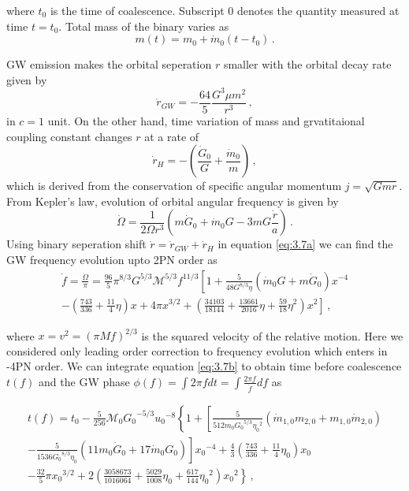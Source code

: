 \documentclass[prd,twocolumn,nofootinbib]{revtex4-1}
\begin{document}
 where $t_0$ is the time of coalescence. Subscript $0$ denotes the quantity measured at time $t=t_0$. Total mass of the binary varies as
 \begin{equation}
 m(t)=m_0+\dot{m}_0(t-t_0)\,.
 \end{equation}
 
 \hspace*{15.5pt}GW emission makes the orbital seperation $r$ smaller with the orbital decay rate given by \cite{PhysRevD.49.2658}
 \begin{equation}
 \dot{r}_{GW}=-\frac{64}{5}\frac{G^3 \mu m^2}{r^3}\,,
 \end{equation}
 in $c=1$ unit. On the other hand, time variation of mass and grvatitaional coupling constant changes $r$ at a rate of 
 \begin{equation}
 \dot{r}_H=-\left(\frac{\dot{G}_0}{G}+\frac{\dot{m}_0}{m}\right)\,,
 \end{equation}
 which is derived from the conservation of specific angular momentum $j=\sqrt{Gmr}$. From Kepler's law, evolution of orbital angular frequency is given by
 \begin{equation}\label{eq:3.7a}
 \dot{\Omega}=\frac{1}{2\Omega r^3}\left(m\dot{G}_0+\dot{m}_0G-3mG\frac{\dot{r}}{a}\right)\,.
 \end{equation}
 \hspace*{15.5pt} Using binary seperation shift $\dot{r}=\dot{r}_{GW}+\dot{r}_H$ in equation \eqref{eq:3.7a} we can find the GW frequency evolution upto 2PN order as
\begin{align} \label{eq:3.7b}
 \dot{f}=\frac{\dot{\Omega}}{\pi}=\frac{96}{5}\pi^{8/3}G^{5/3}\mathcal{M}^{5/3}f^{11/3}\left[1+\frac{5}{48 G^{8/3}\eta}(\dot{m}_0G+m\dot{G}_0)x^{-4} \right. \nonumber\\ \left.  -\left(\frac{743}{336}+\frac{11}{4}\eta\right)x+4\pi x^{3/2}+\left(\frac{34103}{18144}+\frac{13661}{2016}\eta+\frac{59}{18}\eta^2\right)x^2 \right]\,,
 \end{align}
 
where $x=v^2=(\pi M f)^{2/3}$ is the squared velocity of the relative motion. Here we considered only leading order correction to frequency evolution which enters in -4PN order. We can integrate equation \eqref{eq:3.7b} to obtain time before coalescence $t(f)$ and the GW phase $\phi(f)=\int 2 \pi f dt=\int\frac{2\pi f}{\dot{f}}df$ as


\begin{align}
t(f)=t_0-\frac{5}{256}\mathcal{M}_0{G_0}^{-5/3}{u_0}^{-8}\left\{1+\left[\frac{5}{512 {m}_0{G_0}^{5/3}{\eta_0}^2}(\dot{m}_{1,0}m_{2,0}+m_{1,0}\dot{m}_{2,0})\right. \right. \nonumber \\ \left. \left. -\frac{5}{1536{G_0}^{8/3}\eta_0}(11m_0\dot{G}_0+17\dot{m}_0 G_0)\right]{x_0}^{-4}+\frac{4}{3}\left(\frac{743}{336}+\frac{11}{4}{\eta_0}\right)x_0 \right. \nonumber\\ \left. -\frac{32}{5}\pi {x_0}^{3/2}+2\left(\frac{3058673}{1016064}+\frac{5029}{1008}{\eta_0}+\frac{617}{144}{\eta_0}^2\right){x_0}^2 \right\}\,,
\end{align}
\end{document}
